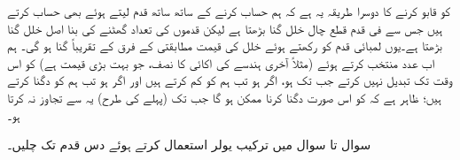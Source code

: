  کو قابو کرنے کا دوسرا طریقہ یہ ہے کہ ہم حساب کرنے کے ساتھ ساتھ قدم  لیتے ہوئے بھی حساب کرتے ہیں جس سے فی قدم قطع چال خلل
   گنا بڑھتا ہے لیکن قدموں کی تعداد گھٹنے کی بنا اصل خلل  گنا بڑھتا ہے۔یوں لمبائی قدم  کو  رکھتے ہوئے خلل کی قیمت مطابقتی  کے فرق   کے تقریباً  گنا ہو گی۔ ہم اب عدد  منتخب کرتے ہوئے (مثلاً آخری ہندسے کی اکائی کا نصف، جو بہت بڑی قیمت ہے)  کو اس وقت تک تبدیل نہیں کرتے جب تک  ہو، اگر  ہو تب ہم  کو  کم کرتے ہیں اور اگر  ہو تب ہم  کو دگنا کرتے ہیں؛  ظاہر ہے کہ  کو اس صورت دگنا کرنا ممکن ہو گا جب تک  (پہلے کی طرح) یہ  سے تجاوز نہ کرتا ہو۔

سوال  تا سوال  میں ترکیب یولر استعمال کرتے ہوئے دس قدم تک چلیں۔ 

